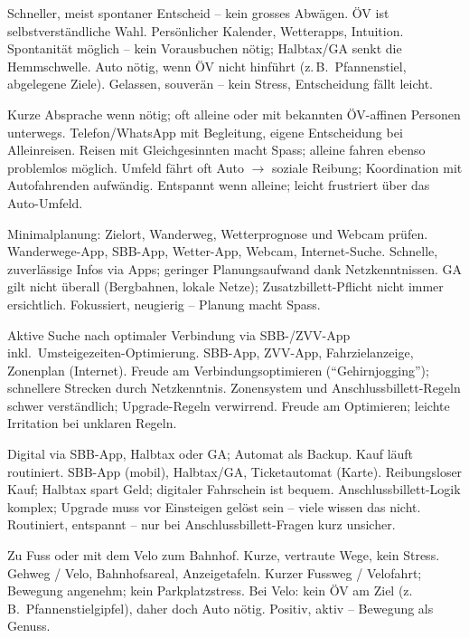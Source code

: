 {Schneller, meist spontaner Entscheid -- kein grosses Abwägen. ÖV ist selbstverständliche Wahl.}
{Persönlicher Kalender, Wetterapps, Intuition.}
{Spontanität möglich -- kein Vorausbuchen nötig; Halbtax/GA senkt die Hemmschwelle.}
{Auto nötig, wenn ÖV nicht hinführt (z.\,B.\ Pfannenstiel, abgelegene Ziele).}
{Gelassen, souverän -- kein Stress, Entscheidung fällt leicht.}

{Kurze Absprache wenn nötig; oft alleine oder mit bekannten ÖV-affinen Personen unterwegs.}
{Telefon/WhatsApp mit Begleitung, eigene Entscheidung bei Alleinreisen.}
{Reisen mit Gleichgesinnten macht Spass; alleine fahren ebenso problemlos möglich.}
{Umfeld fährt oft Auto $\to$ soziale Reibung; Koordination mit Autofahrenden aufwändig.}
{Entspannt wenn alleine; leicht frustriert über das Auto-Umfeld.}

{Minimalplanung: Zielort, Wanderweg, Wetterprognose und Webcam prüfen.}
{Wanderwege-App, SBB-App, Wetter-App, Webcam, Internet-Suche.}
{Schnelle, zuverlässige Infos via Apps; geringer Planungsaufwand dank Netzkenntnissen.}
{GA gilt nicht überall (Bergbahnen, lokale Netze); Zusatzbillett-Pflicht nicht immer ersichtlich.}
{Fokussiert, neugierig -- Planung macht Spass.}

{Aktive Suche nach optimaler Verbindung via SBB-/ZVV-App inkl.\ Umsteigezeiten-Optimierung.}
{SBB-App, ZVV-App, Fahrzielanzeige, Zonenplan (Internet).}
{Freude am Verbindungsoptimieren (\enquote{Gehirnjogging}); schnellere Strecken durch Netzkenntnis.}
{Zonensystem und Anschlussbillett-Regeln schwer verständlich; Upgrade-Regeln verwirrend.}
{Freude am Optimieren; leichte Irritation bei unklaren Regeln.}

{Digital via SBB-App, Halbtax oder GA; Automat als Backup. Kauf läuft routiniert.}
{SBB-App (mobil), Halbtax/GA, Ticketautomat (Karte).}
{Reibungsloser Kauf; Halbtax spart Geld; digitaler Fahrschein ist bequem.}
{Anschlussbillett-Logik komplex; Upgrade muss vor Einsteigen gelöst sein -- viele wissen das nicht.}
{Routiniert, entspannt -- nur bei Anschlussbillett-Fragen kurz unsicher.}

{Zu Fuss oder mit dem Velo zum Bahnhof. Kurze, vertraute Wege, kein Stress.}
{Gehweg / Velo, Bahnhofsareal, Anzeigetafeln.}
{Kurzer Fussweg / Velofahrt; Bewegung angenehm; kein Parkplatzstress.}
{Bei Velo: kein ÖV am Ziel (z.\,B.\ Pfannenstielgipfel), daher doch Auto nötig.}
{Positiv, aktiv -- Bewegung als Genuss.}

